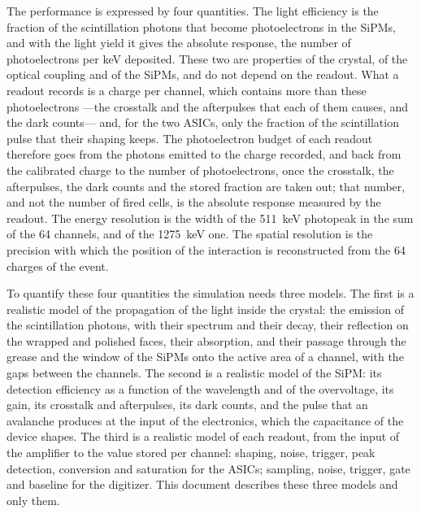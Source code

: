 \documentclass[11pt]{article}
\begin{document}
The performance is expressed by four quantities. The light efficiency is
the fraction of the scintillation photons that become photoelectrons in the
SiPMs, and with the light yield it gives the absolute response, the number
of photoelectrons per keV deposited. These two are properties of the crystal,
of the optical coupling and of the SiPMs, and do not depend on the readout.
What a readout records is a charge per channel, which contains more than
these photoelectrons ---the crosstalk and the afterpulses that each of them
causes, and the dark counts--- and, for the two ASICs, only the fraction of
the scintillation pulse that their shaping keeps. The photoelectron budget
of each readout therefore goes from the photons emitted to the charge
recorded, and back from the calibrated charge to the number of
photoelectrons, once the crosstalk, the afterpulses, the dark counts and the
stored fraction are taken out; that number, and not the number of fired
cells, is the absolute response measured by the readout. The energy
resolution is the width of the 511~keV photopeak in the sum of the 64
channels, and of the 1275~keV one. The spatial resolution is the precision
with which the position of the interaction is reconstructed from the 64
charges of the event.

To quantify these four quantities the simulation needs three models. The
first is a realistic model of the propagation of the light inside the
crystal: the emission of the scintillation photons, with their spectrum and
their decay, their reflection on the wrapped and polished faces, their
absorption, and their passage through the grease and the window of the SiPMs
onto the active area of a channel, with the gaps between the channels. The
second is a realistic model of the SiPM: its detection efficiency as a
function of the wavelength and of the overvoltage, its gain, its crosstalk
and afterpulses, its dark counts, and the pulse that an avalanche produces
at the input of the electronics, which the capacitance of the device shapes.
The third is a realistic model of each readout, from the input of the
amplifier to the value stored per channel: shaping, noise, trigger, peak
detection, conversion and saturation for the ASICs; sampling, noise,
trigger, gate and baseline for the digitizer. This document describes these
three models and only them.
\end{document}
